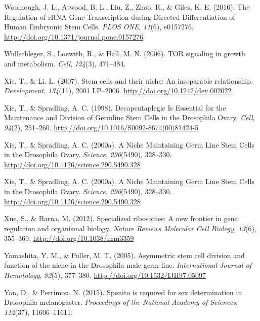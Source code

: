 \documentclass[12pt,oneside]{reedthesis}
\newlength{\cslhangindent}
\newenvironment{cslreferences}%
  {\setlength{\parindent}{0pt}%
  \everypar{\setlength{\hangindent}{\cslhangindent}}\ignorespaces}%
  {\par}
\begin{document}
\begin{cslreferences}
\leavevmode\hypertarget{ref-woolnoughRegulationRRNAGene2016}{}%
Woolnough, J. L., Atwood, B. L., Liu, Z., Zhao, R., \& Giles, K. E. (2016). The Regulation of rRNA Gene Transcription during Directed Differentiation of Human Embryonic Stem Cells. \emph{PLOS ONE}, \emph{11}(6), e0157276. \url{http://doi.org/10.1371/journal.pone.0157276}

\leavevmode\hypertarget{ref-Wullschleger2006b}{}%
Wullschleger, S., Loewith, R., \& Hall, M. N. (2006). TOR signaling in growth and metabolism. \emph{Cell}, \emph{124}(3), 471--484.

\leavevmode\hypertarget{ref-Xie2007a}{}%
Xie, T., \& Li, L. (2007). Stem cells and their niche: An inseparable relationship. \emph{Development}, \emph{134}(11), 2001 LP--2006. \url{http://doi.org/10.1242/dev.002022}

\leavevmode\hypertarget{ref-Xie1998d}{}%
Xie, T., \& Spradling, A. C. (1998). Decapentaplegic Is Essential for the Maintenance and Division of Germline Stem Cells in the Drosophila Ovary. \emph{Cell}, \emph{94}(2), 251--260. \url{http://doi.org/10.1016/S0092-8674(00)81424-5}

\leavevmode\hypertarget{ref-Xie2000b}{}%
Xie, T., \& Spradling, A. C. (2000a). A Niche Maintaining Germ Line Stem Cells in the Drosophila Ovary. \emph{Science}, \emph{290}(5490), 328--330. \url{http://doi.org/10.1126/science.290.5490.328}

\leavevmode\hypertarget{ref-Xie2000b}{}%
Xie, T., \& Spradling, A. C. (2000a). A Niche Maintaining Germ Line Stem Cells in the Drosophila Ovary. \emph{Science}, \emph{290}(5490), 328--330. \url{http://doi.org/10.1126/science.290.5490.328}

\leavevmode\hypertarget{ref-Xue2012}{}%
Xue, S., \& Barna, M. (2012). Specialized ribosomes: A new frontier in gene regulation and organismal biology. \emph{Nature Reviews Molecular Cell Biology}, \emph{13}(6), 355--369. \url{http://doi.org/10.1038/nrm3359}

\leavevmode\hypertarget{ref-Yamashita2005d}{}%
Yamashita, Y. M., \& Fuller, M. T. (2005). Asymmetric stem cell division and function of the niche in the Drosophila male germ line. \emph{International Journal of Hematology}, \emph{82}(5), 377--380. \url{http://doi.org/10.1532/IJH97.05097}

\leavevmode\hypertarget{ref-Yan2015}{}%
Yan, D., \& Perrimon, N. (2015). Spenito is required for sex determination in Drosophila melanogaster. \emph{Proceedings of the National Academy of Sciences}, \emph{112}(37), 11606--11611.


\end{cslreferences}
\end{document}
